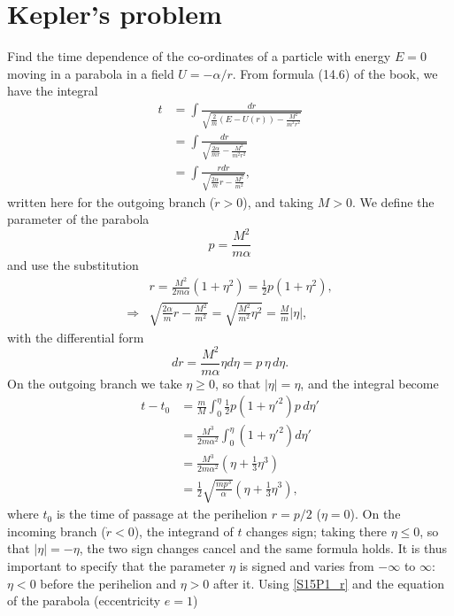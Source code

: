 \section{Kepler's problem}


\begin{problem}[title={Time dependence on a parabolic Kepler orbit}]
{
Find the time dependence of the co-ordinates of a particle with energy $E=0$ moving in a parabola in a field $U=-\alpha/r$.
}
{
From formula (14.6) of the book, we have the integral
\begin{align*}
    t &= \int \frac{dr}{\sqrt{\frac{2}{m}\left(E-U(r)\right)-\frac{M^2}{m^2r^2}}} \\
    &= \int \frac{dr}{\sqrt{\frac{2\alpha}{mr}-\frac{M^2}{m^2r^2}}} \\
    &= \int \frac{rdr}{\sqrt{\frac{2\alpha}{m}r-\frac{M^2}{m^2}}},
\end{align*}
written here for the outgoing branch ($\Dot{r}>0$), and taking $M>0$. We define the parameter of the parabola
\begin{equation*}
    p = \frac{M^2}{m\alpha}
\end{equation*}
and use the substitution
\begin{align}
    & r = \frac{M^2}{2m\alpha}\left(1+\eta^2\right) = \frac{1}{2}p\left(1+\eta^2\right), \label{S15P1_r} \\
    \Rightarrow & \sqrt{\frac{2\alpha}{m}r - \frac{M^2}{m^2}} = \sqrt{\frac{M^2}{m^2}\eta^2} = \frac{M}{m}|\eta| , \nonumber
\end{align}
with the differential form
\begin{equation*}
    dr = \frac{M^2}{m\alpha}\eta d\eta = p\,\eta\,d\eta.
\end{equation*}
On the outgoing branch we take $\eta \geq 0$, so that $|\eta| = \eta$, and the integral become
\begin{align*}
    t - t_0 &= \frac{m}{M}\int_0^\eta \frac{1}{2}p\left(1+\eta'^2\right) p \, d\eta' \\
    &= \frac{M^3}{2m\alpha^2}\int_0^\eta\left(1+\eta'^2\right)d\eta' \\
    &= \frac{M^3}{2m\alpha^2}\left(\eta+\frac{1}{3}\eta^3\right) \\
    &= \frac{1}{2}\sqrt{\frac{mp^3}{\alpha}}\left(\eta+\frac{1}{3}\eta^3\right),
\end{align*}
where $t_0$ is the time of passage at the perihelion $r = p/2$ ($\eta = 0$). On the incoming branch ($\Dot{r}<0$), the integrand of $t$ changes sign; taking there $\eta \leq 0$, so that $|\eta| = -\eta$, the two sign changes cancel and the same formula holds. It is thus important to specify that the parameter $\eta$ is signed and varies from $-\infty$ to $\infty$: $\eta<0$ before the perihelion and $\eta>0$ after it. Using \eqref{S15P1_r} and the equation of the parabola (eccentricity $e=1$)
}
\end{problem}
